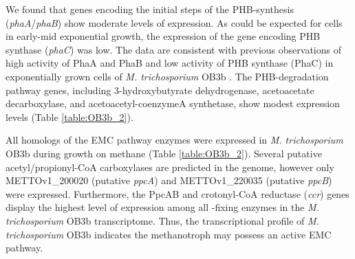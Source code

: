 We found that genes encoding the initial steps of the PHB-synthesis (\textit{phaA}/\textit{phaB}) show moderate levels of expression.
As could be expected for cells in early-mid exponential growth, the expression of the gene encoding PHB synthase (\textit{phaC}) was low.
The data are consistent with previous observations of high activity of PhaA and PhaB and low activity of PHB synthase (PhaC) in exponentially grown cells of \textit{M. trichosporium} OB3b \cite{williams1998, doronina2008}.
The PHB-degradation pathway genes, including 3-hydroxybutyrate dehydrogenase, acetoacetate decarboxylase, and acetoacetyl-coenzymeA synthetase, show modest expression levels (Table \ref{table:OB3b_2}).

All homologs of the EMC pathway enzymes were expressed in \textit{M. trichosporium} OB3b during growth on methane (Table \ref{table:OB3b_2}).
Several putative acetyl/propionyl-CoA carboxylases are predicted in the genome, however only METTOv1\_200020 (putative \textit{ppcA}) and METTOv1\_220035 (putative \textit{ppcB}) were expressed.
Furthermore, the PpcAB and crotonyl-CoA reductase (\textit{ccr}) genes display the highest level of expression among all -fixing enzymes in the \textit{M. trichosporium} OB3b transcriptome.
Thus, the transcriptional profile of \textit{M. trichosporium} OB3b indicates the methanotroph may possess an active EMC pathway.

